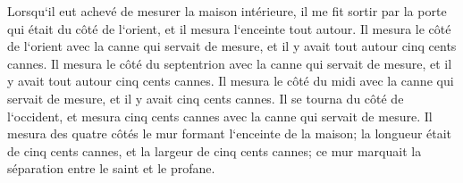 \verse Lorsqu`il eut achevé de mesurer la maison intérieure, il me fit sortir par la porte qui était du côté de l`orient, et il mesura l`enceinte tout autour. 
\verse Il mesura le côté de l`orient avec la canne qui servait de mesure, et il y avait tout autour cinq cents cannes. 
\verse Il mesura le côté du septentrion avec la canne qui servait de mesure, et il y avait tout autour cinq cents cannes. 
\verse Il mesura le côté du midi avec la canne qui servait de mesure, et il y avait cinq cents cannes. 
\verse Il se tourna du côté de l`occident, et mesura cinq cents cannes avec la canne qui servait de mesure. 
\verse Il mesura des quatre côtés le mur formant l`enceinte de la maison; la longueur était de cinq cents cannes, et la largeur de cinq cents cannes; ce mur marquait la séparation entre le saint et le profane. 

